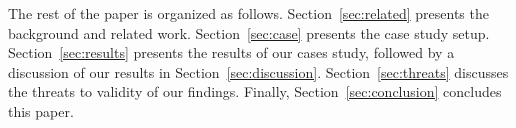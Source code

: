 

	

The rest of the paper is organized as follows. Section~\ref{sec:related} presents the background and related work. Section~\ref{sec:case} presents the case study setup. Section~\ref{sec:results} presents the results of our cases study, followed by a discussion of our results in Section~\ref{sec:discussion}. Section~\ref{sec:threats} discusses the threats to validity of our findings. Finally, Section~\ref{sec:conclusion} concludes this paper.
